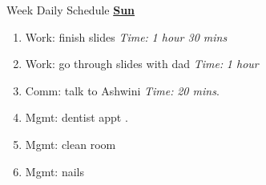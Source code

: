 \documentclass[serif, mathserif, final]{beamer}
\newcommand{\timeEst}[1]{\textit{Time:} \textit{#1}}
\begin{document}
\begin{frame}{}
\begin{columns}
\begin{column}{0.50\linewidth}
\begin{block}{Week Daily Schedule}
\textbf{\small \underline{Sun}}
\begin{enumerate} 
\tiny \item \tiny Work: finish slides \timeEst{1 hour 30 mins} 
\item \tiny Work: go through slides with dad \timeEst{1 hour} 
\item \tiny Comm: talk to Ashwini \timeEst{20 mins}. 
\item \tiny Mgmt: dentist appt .
\item \tiny Mgmt: clean room 
\item \tiny Mgmt: nails 

\end{enumerate} 

\end{block} 
\end{column}%



\end{columns}
\end{frame}
\end{document}
